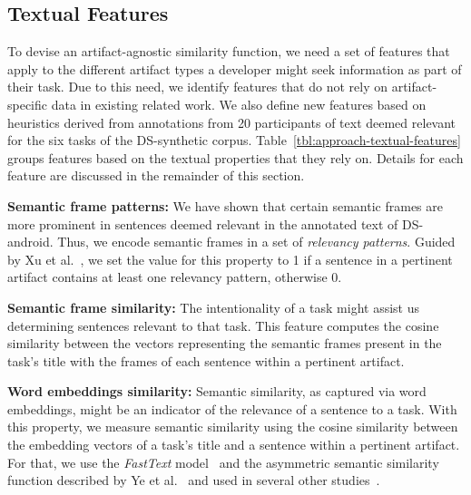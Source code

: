 
\subsection{Textual Features}



To devise an artifact-agnostic similarity function, we need a set of features that apply to the different artifact types a developer might seek information as part of their task.
Due to this need, we identify features that do not rely on artifact-specific data in existing related work. 
We also define new features based 
on heuristics derived from annotations from 20 participants of text deemed relevant
for the six tasks of the \acs{DS-synthetic} corpus.
Table~\ref{tbl:approach-textual-features} groups features based on the textual properties that they rely on. Details for each feature are discussed in the remainder of this section.




\vspace{3mm}
\begin{hangparas}{1em}{1}
    \textbf{Semantic frame patterns:} We have shown that certain semantic frames are more prominent in sentences deemed relevant in the annotated text of \acs{DS-android}.
    Thus, we encode semantic frames in a set of \textit{relevancy patterns}. 
    Guided by Xu et al.~\cite{Xu2017}, we set the value for this property to 1 if a sentence in a pertinent artifact contains at least one relevancy pattern, otherwise 0.
\end{hangparas}


\vspace{3mm}
\begin{hangparas}{1em}{1}
    \textbf{Semantic frame similarity:} The intentionality of a task might assist us determining sentences relevant to that task. 
    This feature computes the cosine similarity between the vectors representing the semantic frames present in the task's title with the frames of each sentence within a pertinent artifact. 
\end{hangparas}


\vspace{3mm}
\begin{hangparas}{1em}{1}
    \textbf{Word embeddings similarity:} Semantic similarity, as captured via word embeddings, might be an indicator of the relevance of a sentence to a task. With this property, we measure semantic similarity using the cosine similarity between the embedding vectors of a task's title and a sentence within a pertinent artifact. 
    For that, we use the \textit{FastText} model~\cite{bojanowski2017FastText} and the asymmetric semantic similarity function described by Ye et al.~\cite{Ye2016} and used in several other studies~\cite{silva2019, Huang2018, Xu2017}.
    
    
\end{hangparas}


